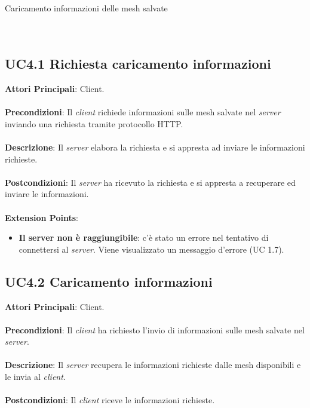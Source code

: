 \begin{usecase}{4}{Caricamento informazioni delle mesh salvate}
\\ 
\\ 
\\ 
\label{uc:informazioni}
\end{usecase}

\subsection{UC4.1 Richiesta caricamento informazioni}
\textbf{Attori Principali}: Client.
\\\\ \textbf{Precondizioni}: Il \emph{client} richiede informazioni sulle mesh salvate nel \emph{server} inviando una richiesta tramite protocollo HTTP.
\\\\ \textbf{Descrizione}: Il \emph{server} elabora la richiesta e si appresta ad inviare le informazioni richieste.
\\\\ \textbf{Postcondizioni}: Il \emph{server} ha ricevuto la richiesta e si appresta a recuperare ed inviare le informazioni.
\\\\ \textbf{Extension Points}:
\begin{itemize}
\item \textbf{Il server non è raggiungibile}: c'è stato un errore nel tentativo di connettersi al \emph{server}. Viene visualizzato un messaggio d'errore (UC 1.7).
\end{itemize}

\subsection{UC4.2 Caricamento informazioni}
\textbf{Attori Principali}: Client.
\\\\ \textbf{Precondizioni}: Il \emph{client} ha richiesto l'invio di informazioni sulle mesh salvate nel \emph{server}.
\\\\ \textbf{Descrizione}: Il \emph{server} recupera le informazioni richieste dalle mesh disponibili e le invia al \emph{client}.
\\\\ \textbf{Postcondizioni}: Il \emph{client} riceve le informazioni richieste.


